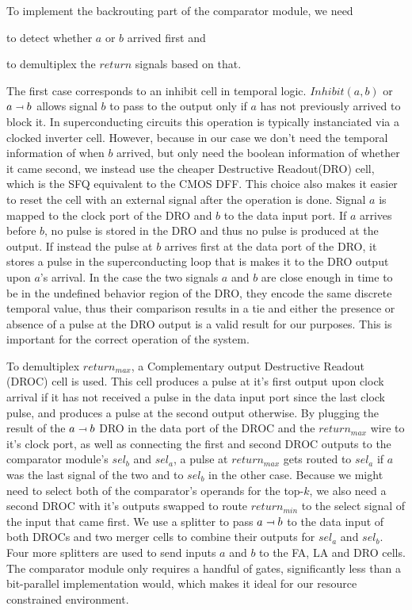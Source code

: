 \documentclass{article}
\newcommand{\inhib}{\relbar\mapsfromchar}
\begin{document}
To implement the backrouting part of the comparator module,
we need \begin{enumerate*}[label=\emph{\alph*})] \item to
    detect whether $a$ or $b$ arrived first and \item to
      demultiplex the $return$ signals based on that.
\end{enumerate*} The first case corresponds to an inhibit
cell in temporal logic. $Inhibit(a,b)$ or $a \inhib b$
allows signal $b$ to pass to the output only if $a$ has not
previously arrived to block it. In superconducting circuits
this operation is typically instanciated via a clocked
inverter cell. However, because in our case we don't need
the temporal information of when $b$ arrived, but only need
the boolean information of whether it came second, we
instead use the cheaper Destructive Readout(DRO) cell, which
is the SFQ equivalent to the CMOS DFF. This choice also
makes it easier to reset the cell with an external signal
after the operation is done. Signal $a$ is mapped to the
clock port of the DRO and $b$ to the data input
port. If $a$ arrives before $b$, no pulse is stored in the
DRO and thus no pulse is produced at the output. If instead
the pulse at $b$ arrives first at the data port of the DRO,
it stores a pulse in the superconducting loop that is makes
it to the DRO output upon $a$'s arrival. In the case the two
signals $a$ and $b$ are close enough in time to be in the
undefined behavior region of the DRO, they encode the same
discrete temporal value, thus their comparison results in a
tie and either the presence or absence of a pulse at the DRO
output is a valid result for our purposes. This is important
for the correct operation of the system.

To demultiplex $return_{max}$, a Complementary output
Destructive Readout (DROC) cell is used. This cell produces
a pulse at it's first output upon clock arrival if it has
not received a pulse in the data input port since the last
clock pulse, and produces a pulse at the second output
otherwise. By plugging the result of the $a \inhib b$ DRO in
the data port of the DROC and the $return_{max}$ wire to
it's clock port, as well as connecting the first and second
DROC outputs to the comparator module's $sel_b$ and $sel_a$,
a pulse at $return_{max}$ gets routed to $sel_a$ if $a$ was
the last signal of the two and to $sel_b$ in the other case.
Because we might need to select both of the comparator's
operands for the top-$k$, we also need a second DROC with
it's outputs swapped to route $return_{min}$ to the select
signal of the input that came first. We use a splitter to
pass $a \inhib b$ to the data input of both DROCs and two
merger cells to combine their outputs for $sel_a$ and
$sel_b$. Four more splitters are used to send inputs $a$ and
$b$ to the FA, LA and DRO cells. The comparator module only
requires a handful of gates, significantly less than a
bit-parallel implementation would, which makes it ideal for
our resource constrained environment.
\end{document}

